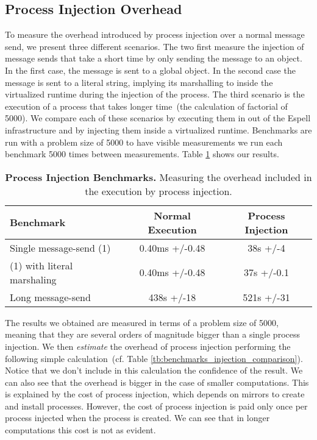\subsection{Process Injection Overhead}

To measure the overhead introduced by process injection over a normal message send, we present three different scenarios. The two first measure the injection of message sends that take a short time by only sending the  message to an object. In the first case, the message is sent to a global object. In the second case the message is sent to a literal string, implying its marshalling to inside the virtualized runtime during the injection of the process. The third scenario is the execution of a process that takes longer time~(the calculation of factorial of 5000). We compare each of these scenarios by executing them in out of the Espell infrastructure and by injecting them inside a virtualized runtime. Benchmarks are run with a problem size of 5000 to have visible measurements \ie we run each benchmark 5000 times between measurements. Table \ref{tb:benchmarks_injection} shows our results.

\begin{table}[ht]

 	\centering
 	\begin{tabular}{lcc}%
			\toprule
			\textbf{Benchmark}
 			& \textbf{Normal Execution}
			& \textbf{Process Injection}\\
		\midrule
		Single message-send (1) &0.40ms +/-0.48 & 38s +/-4 \\\midrule
		(1) with literal marshaling & 0.40ms +/-0.48 & 37s +/-0.1 \\\midrule
		Long message-send & 438s +/-18 & 521s +/-31\\\midrule
 	\end{tabular}
	\vspace*{0.2cm}
 	\caption{\textbf{Process Injection Benchmarks.} Measuring the overhead included in the execution by process injection.\label{tb:benchmarks_injection}}
 \end{table}

The results we obtained are measured in terms of a problem size of 5000, meaning that they are several orders of magnitude bigger than a single process injection. We then \emph{estimate} the overhead of process injection performing the following simple calculation~(cf. Table \ref{tb:benchmarks_injection_comparison}). Notice that we don't include in this calculation the confidence of the result. We can also see that the overhead is bigger in the case of smaller computations. This is explained by the cost of process injection, which depends on mirrors to create and install processes. However, the cost of process injection is paid only once per process injected when the process is created. We can see that in longer computations this cost is not as evident.

